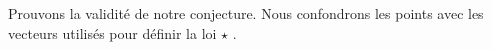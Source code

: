 \begin{multicols}{2}
	\bigskip

\end{multicols}


\bigskip

Prouvons la validité de notre conjecture. Nous confondrons les points avec les vecteurs utilisés pour définir la loi $\star$ .

